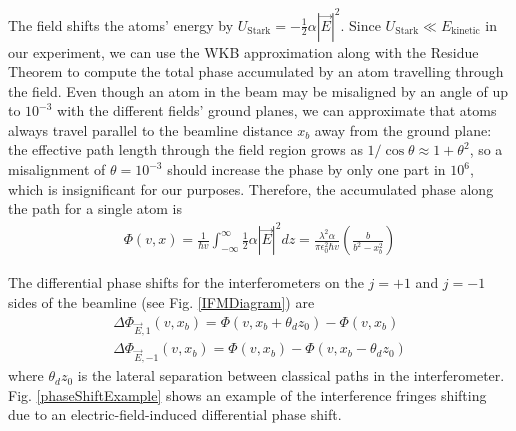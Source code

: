 \documentclass[twocolumn,prl,showpacs,superscriptaddress]{revtex4-1}   %
\newcommand{\abs}[1]{\left|#1\right|}
\newcommand{\figref}[1]{Fig. \ref{#1}}
\begin{document}
The field shifts the atoms' energy by $U_{\mathrm{Stark}} = -\frac{1}{2}\alpha\abs{\vec{E}}^2$.
Since $U_{\mathrm{Stark}} \ll E_{\mathrm{kinetic}}$ in our experiment, we can use the WKB approximation along with the Residue Theorem to compute the total phase accumulated by an atom travelling through the field.
Even though an atom in the beam may be misaligned by an angle of up to $10^{-3}$ with the different fields' ground planes, we can approximate that atoms always travel parallel to the beamline distance $x_b$ away from the ground plane: the effective path length through the field region grows as $1/\cos{\theta} \approx 1+\theta^2$, so a misalignment of $\theta = 10^{-3}$ should increase the phase by only one part in $10^6$, which is insignificant for our purposes. Therefore, the accumulated phase along the path for a single atom is
\begin{align}
	\Phi(v,x) = 
	\frac{1}{\hbar v} \int_{-\infty}^{\infty} \frac{1}{2} \alpha |\vec{E}|^2 dz =	
	\frac{\lambda^2 \alpha}{\pi \epsilon_0^2 \hbar v}
	\left( \frac{b}{b^2-x_b^2} \right)
	\label{accumPhasePillars}
\end{align}

The differential phase shifts for the interferometers on the $j=+1$ and $j=-1$ sides of the beamline (see \figref{IFMDiagram}) are
\begin{align}
	\Delta\Phi_{\vec{E},1}(v,x_b) = \Phi(v, x_b+\theta_d z_0) - \Phi(v, x_b) \nonumber \\
	\Delta\Phi_{\vec{E},-1}(v,x_b) = \Phi(v, x_b) - \Phi(v, x_b-\theta_d z_0)
	\label{deltaPhasePillars}
\end{align}
where $\theta_d z_0$ is the lateral separation between classical paths in the interferometer. 
\figref{phaseShiftExample} shows an example of the interference fringes shifting due to an electric-field-induced differential phase shift.
\end{document}
